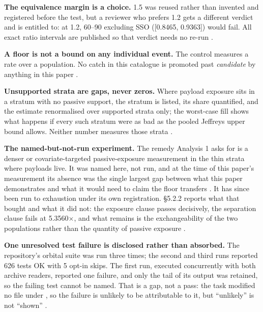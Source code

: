 \documentclass[11pt]{article}
\begin{document}
\textbf{The equivalence margin is a choice.} 1.5 was reused rather than invented and registered before the test, but a reviewer who prefers 1.2 gets a different verdict and is entitled to: at 1.2, 60--90\textdegree{} excluding SSO ([0.8465, 0.9363]) would fail. All exact ratio intervals are published so that verdict needs no re-run%
.

\textbf{A floor is not a bound on any individual event.} The control measures a rate over a population. No catch in this catalogue is promoted past \emph{candidate} by anything in this paper%
.

\textbf{Unsupported strata are gaps, never zeros.} Where payload exposure sits in a stratum with no passive support, the stratum is listed, its share quantified, and the estimate renormalised over supported strata only; the worst-case fill shows what happens if every such stratum were as bad as the pooled Jeffreys upper bound allows. Neither number measures those strata%
.

\textbf{The named-but-not-run experiment.} The remedy Analysis 1 asks for is a denser or covariate-targeted passive-exposure measurement in the thin strata where payloads live. It was named here, not run, and at the time of this paper's measurement its absence was the single largest gap between what this paper demonstrates and what it would need to claim the floor transfers%
. It has since been run to exhaustion under its own registration. \S{}5.2.2 reports what that bought and what it did not: the exposure clause passes decisively, the separation clause fails at 5.3560$\times$, and what remains is the exchangeability of the two populations rather than the quantity of passive exposure%
.

\textbf{One unresolved test failure is disclosed rather than absorbed.} The repository's orbital suite was run three times; the second and third runs reported 626 tests OK with 5 opt-in skips. The first run, executed concurrently with both archive readers, reported one failure, and only the tail of its output was retained, so the failing test cannot be named. That is a gap, not a pass: the task modified no file under , so the failure is unlikely to be attributable to it, but ``unlikely'' is not ``shown''%
.
\end{document}

